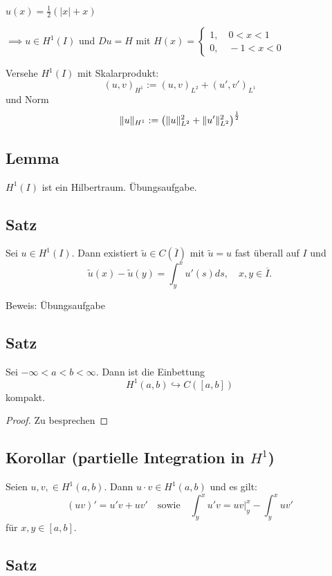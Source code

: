 \begin{ex}
  $u(x) = \frac{1}{2}(|x| + x)$
  
  $\implies u \in H^1(I)$ und $Du = H$ mit $H(x) = 
  \begin{cases}
    1,\quad 0 < x < 1 \\
    0,\quad -1 < x < 0
  \end{cases}$
\end{ex}

Versehe $H^1(I)$ mit Skalarprodukt: $$(u,v)_{H^1} := (u,v)_{L^2} + (u', v')_{L^1}$$ und Norm $$\lVert u \rVert_{H^1} := \left(\lVert u \rVert_{L^2}^2 + \lVert u' \rVert_{L^2}^2\right)^\frac{1}{2}$$

\subsection{Lemma}

$H^1(I)$ ist ein Hilbertraum. Übungsaufgabe.

\subsection{Satz}

Sei $u \in H^1(I)$.
Dann existiert $\tilde u \in C(\overline I)$ mit $\tilde u = u$ fast überall auf $I$ und 
$$
\tilde u(x) - \tilde u(y) = \int_y^x u'(s) ds, \quad x,y \in \overline I.
$$

Beweis: Übungsaufgabe

\subsection{Satz}

Sei $-\infty < a < b < \infty$. Dann ist die Einbettung
$$
H^1(a,b) \hookrightarrow C([a,b])
$$
kompakt.

\begin{proof}
  Zu besprechen
\end{proof}

\subsection{Korollar (partielle Integration in $H^1$)}

Seien $u,v, \in H^1(a,b)$.
Dann $u\cdot v \in H^1(a,b)$ und es gilt:
$$ (uv)' = u'v + u v' \quad\text{sowie}\quad \int_y^x u'v = uv|_y^x - \int_y^x u v'$$
für $x,y \in [a,b]$.

\subsection{Satz}

